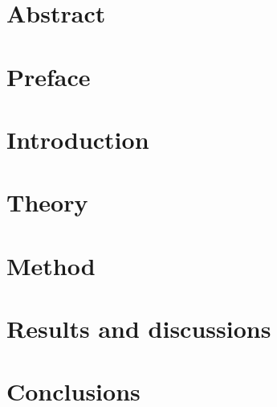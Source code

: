 \documentclass[12pt]{article}
\begin{document}


\section*{Abstract}

\newpage

\section*{Preface}

\newpage

\tableofcontents
\newpage

\section{Introduction} \label{intro}


\section{Theory} \label{theory}


\section{Method} \label{method}


\section{Results and discussions} \label{results}


\newpage
\section{Conclusions} \label{conclusions}


\medskip
\printbibliography
\end{document}
